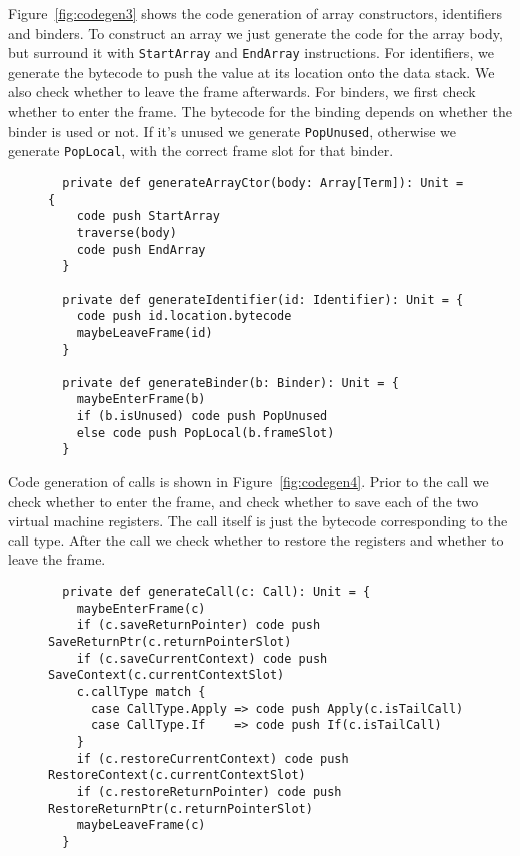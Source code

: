 Figure~\ref{fig:codegen3} shows the code generation of
array constructors, identifiers and binders.
To construct an array we just generate the code for the array body,
but surround it with \verb!StartArray! and \verb!EndArray! instructions.
For identifiers, we generate the bytecode
to push the value at its location onto the data stack.
We also check whether to leave the frame afterwards.
For binders, we first check whether to enter the frame.
The bytecode for the binding depends on whether the binder is used or not.
If it's unused we generate \verb!PopUnused!,
otherwise we generate \verb!PopLocal!,
with the correct frame slot for that binder.

\begin{figure}
\begin{verbatim}
  private def generateArrayCtor(body: Array[Term]): Unit = {
    code push StartArray
    traverse(body)
    code push EndArray
  }

  private def generateIdentifier(id: Identifier): Unit = {
    code push id.location.bytecode
    maybeLeaveFrame(id)
  }

  private def generateBinder(b: Binder): Unit = {
    maybeEnterFrame(b)
    if (b.isUnused) code push PopUnused
    else code push PopLocal(b.frameSlot)
  }
\end{verbatim}
\getcaption
\end{figure}

Code generation of calls is shown in Figure~\ref{fig:codegen4}.
Prior to the call we check whether to enter the frame,
and check whether to save each of the two virtual machine registers.
The call itself is just the bytecode corresponding to the call type.
After the call we check whether to restore the registers
and whether to leave the frame.

\begin{figure}
\begin{verbatim}
  private def generateCall(c: Call): Unit = {
    maybeEnterFrame(c)
    if (c.saveReturnPointer) code push SaveReturnPtr(c.returnPointerSlot)
    if (c.saveCurrentContext) code push SaveContext(c.currentContextSlot)
    c.callType match {
      case CallType.Apply => code push Apply(c.isTailCall)
      case CallType.If    => code push If(c.isTailCall)
    }
    if (c.restoreCurrentContext) code push RestoreContext(c.currentContextSlot)
    if (c.restoreReturnPointer) code push RestoreReturnPtr(c.returnPointerSlot)
    maybeLeaveFrame(c)
  }
\end{verbatim}
\getcaption
\end{figure}



